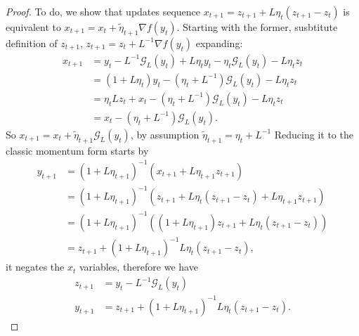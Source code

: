         \begin{proof}
            To do, we show that updates sequence $x_{t + 1} = z_{t + 1} + L\eta_t (z_{t + 1} - z_t)$ is equivalent to $x_{t + 1} = x_t + \tilde\eta_{t + 1}\nabla f(y_t)$. 
            Starting with the former, susbtitute definition of $z_{t + 1}$, $z_{t + 1} = z_t + L^{-1}\nabla f(y_t)$ expanding: 
            \begin{align*}
                x_{t + 1} &= y_t - L^{-1}\mathcal G_L(y_t) 
                + L \eta_t y_t - \eta_t \mathcal G_L(y_t) - L\eta_t z_t
                \\
                &= 
                (1 + L\eta_t)y_t - (\eta_t + L^{-1})\mathcal G_L(y_t) - L\eta_t z_t
                \\
                &= \eta_t Lz_t + x_t -(\eta_t + L^{-1}) \mathcal G_L(y_t)  - L\eta_t z_t
                \\
                &= x_t - (\eta_t + L^{-1})\mathcal G_L(y_t). 
            \end{align*}
            So $x_{t + 1} = x_t + \tilde \eta_{t + 1}\mathcal G_L(y_t)$, by assumption $\tilde \eta_{t + 1} = \eta_t + L^{-1}$
            Reducing it to the classic momentum form starts by 
            \begin{align*}
                y_{t + 1} &= (1 + L\eta_{t + 1})^{-1} (x_{t + 1} + L\eta_{t + 1}z_{t + 1})
                \\
                &= (1 + L\eta_{t + 1})^{-1} (
                    z_{t + 1} + L\eta_t (z_{t + 1} - z_t) + L\eta_{t + 1} z_{t + 1}
                )
                \\
                &= 
                (1 + L\eta_{t + 1})^{-1} (
                    (1 + L\eta_{t + 1})z_{t + 1} + L\eta_t(z_{t + 1} - z_t)
                )
                \\
                &= z_{t + 1} + (1 + L\eta_{t + 1})^{-1}L\eta_t (z_{t + 1} - z_t), 
            \end{align*}
            it negates the $x_t$ variables, therefore we have 
            \begin{align*}
                z_{t + 1} &= y_t - L^{-1} \mathcal G_L (y_t)
                \\
                y_{t + 1} &= z_{t + 1} + (1 + L\eta_{t + 1})^{-1}L\eta_t (z_{t + 1} - z_t).
            \end{align*}
        \end{proof}
